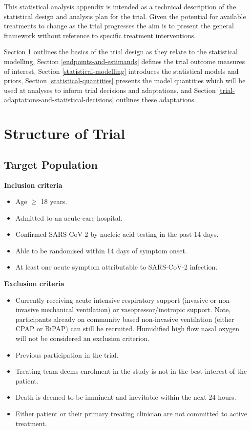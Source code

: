 \documentclass[
  11pt,
]{article}
\providecommand{\tightlist}{%
  \setlength{\itemsep}{0pt}\setlength{\parskip}{0pt}}
\begin{document}
This statistical analysis appendix is intended as a technical description of the statistical design and analysis plan for the trial.
Given the potential for available treatments to change as the trial progresses the aim is to present the general framework without reference to specific treatment interventions.

Section \ref{structure-of-trial} outlines the basics of the trial design as they relate to the statistical modelling, Section \ref{endpoints-and-estimands} defines the trial outcome measures of interest, Section \ref{statistical-modelling} introduces the statistical models and priors, Section \ref{statistical-quantities} presents the model quantities which will be used at analyses to inform trial decisions and adaptations, and Section \ref{trial-adaptations-and-statistical-decisions} outlines these adaptations.

\hypertarget{structure-of-trial}{%
\section{Structure of Trial}\label{structure-of-trial}}

\hypertarget{target-population}{%
\subsection{Target Population}\label{target-population}}

\textbf{Inclusion criteria}

\begin{itemize}
\tightlist
\item
  Age \(\geq\) 18 years.
\item
  Admitted to an acute-care hospital.
\item
  Confirmed SARS-CoV-2 by nucleic acid testing in the past 14 days.
\item
  Able to be randomised within 14 days of symptom onset.
\item
  At least one acute symptom attributable to SARS-CoV-2 infection.
\end{itemize}

\textbf{Exclusion criteria}

\begin{itemize}
\tightlist
\item
  Currently receiving acute intensive respiratory support (invasive or non-invasive mechanical ventilation) or vasopressor/inotropic support. Note, participants already on community based non-invasive ventilation (either CPAP or BiPAP) can still be recruited. Humidified high flow nasal oxygen will not be considered an exclusion criterion.
\item
  Previous participation in the trial.
\item
  Treating team deems enrolment in the study is not in the best interest of the patient.
\item
  Death is deemed to be imminent and inevitable within the next 24 hours.
\item
  Either patient or their primary treating clinician are not committed to active treatment.
\end{itemize}
\end{document}
